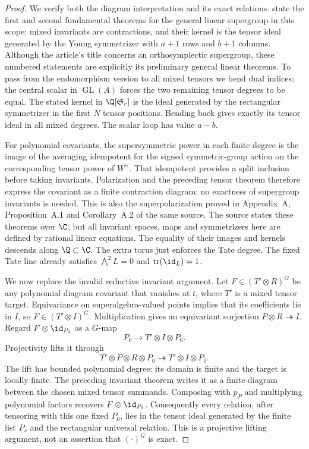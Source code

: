 \begin{proof}
We verify both the diagram interpretation and its exact relations.
\citet[Theorem~2.1, Corollary~2.2, Theorem~2.3 and
Corollary~2.5]{c_lehrerzhang2021super} state the first and second
fundamental theorems for the general linear supergroup in this
scope: mixed invariants are contractions, and their kernel is the
tensor ideal generated by the Young symmetrizer with $a+1$ rows
and $b+1$ columns.  Although the article's title concerns an
orthosymplectic supergroup, these numbered statements are explicitly
its preliminary general linear theorems.  To pass from the
endomorphism version to all mixed tensors we bend dual indices;
the central scalar in $\operatorname{GL}(A)$ forces the two
remaining tensor degrees to be equal.  The stated kernel in
$\Q[\mathfrak S_r]$ is the ideal generated by the rectangular
symmetrizer in the first $N$ tensor positions.  Bending back gives
exactly its tensor ideal in all mixed degrees.  The scalar loop
has value $a-b$.

For polynomial covariants, the supersymmetric power in each finite
degree is the image of the averaging idempotent for the signed
symmetric-group action on the corresponding tensor power of
$W^\vee$.  That idempotent provides a split inclusion before taking
invariants.  Polarization and the preceding tensor theorem
therefore express the covariant as a finite contraction diagram;
no exactness of supergroup invariants is needed.  This is also the
superpolarization proved in Appendix~A, Proposition~A.1 and
Corollary~A.2 of the same source.  The source states these theorems
over $\C$, but all invariant spaces, maps and symmetrizers here
are defined by rational linear equations.  The equality of their
images and kernels descends along $\Q\subset\C$.
The extra torus just enforces the Tate degree.  The fixed Tate
line already satisfies $\bigwedge^2L=0$ and
$\operatorname{tr}(\id_L)=1$.

We now replace the invalid reductive invariant argument.  Let
$F\in(T'\otimes R)^G$ be any polynomial diagram covariant that
vanishes at $t$, where $T'$ is a mixed tensor target.  Equivariance
on superalgebra-valued points implies that its coefficients lie
in $I$, so $F\in(T'\otimes I)^G$.  Multiplication gives an
equivariant surjection $P\otimes R\twoheadrightarrow I$.
Regard $F\otimes\id_{P_0}$ as a $G$-map
\[
 P_0\longrightarrow T'\otimes I\otimes P_0.
\]
Projectivity lifts it through
\[
 T'\otimes P\otimes R\otimes P_0
     \twoheadrightarrow T'\otimes I\otimes P_0.
\]
The lift has bounded polynomial degree: its domain is finite and
the target is locally finite.  The preceding invariant theorem
writes it as a finite diagram between the chosen mixed tensor
summands.  Composing with $p_P$ and multiplying polynomial factors
recovers $F\otimes\id_{P_0}$.  Consequently every relation,
after tensoring with this one fixed $P_0$, lies in the tensor ideal
generated by the finite list $P_s$ and the rectangular universal
relation.  This is a projective lifting argument, not an assertion
that $(\cdot)^G$ is exact.


\end{proof}
